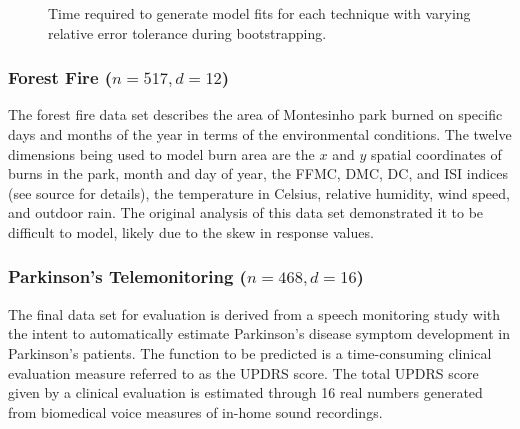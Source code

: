 \documentclass[smallextended]{svjour3}       %
\begin{document}
\begin{figure}[htb]
  \caption{Time required to generate model fits for each technique with varying relative error tolerance during bootstrapping.
    \vspace{-.3cm}}
  \label{fig_eval_times}
\end{figure}

\subsubsection{Forest Fire ($n = 517, d = 12$)}
The forest fire data set \cite{cortez2007data} describes the area of Montesinho park burned on specific days and months of the year in terms of the environmental conditions. The twelve dimensions being used to model burn area are the $x$ and $y$ spatial coordinates of burns in the park, month and day of year, the FFMC, DMC, DC, and ISI indices (see source for details), the temperature in Celsius, relative humidity, wind speed, and outdoor rain. The original analysis of this data set demonstrated it to be difficult to model, likely due to the skew in response values.

\subsubsection{Parkinson's Telemonitoring ($n = 468, d = 16$)}
The final data set for evaluation \cite{tsanas2010accurate} is derived from a speech monitoring study with the intent to automatically estimate Parkinson's disease symptom development in Parkinson's patients. The function to be predicted is a time-consuming clinical evaluation measure referred to as the UPDRS score. The total UPDRS score given by a clinical evaluation is estimated through 16 real numbers generated from biomedical voice measures of in-home sound recordings.
\end{document}
